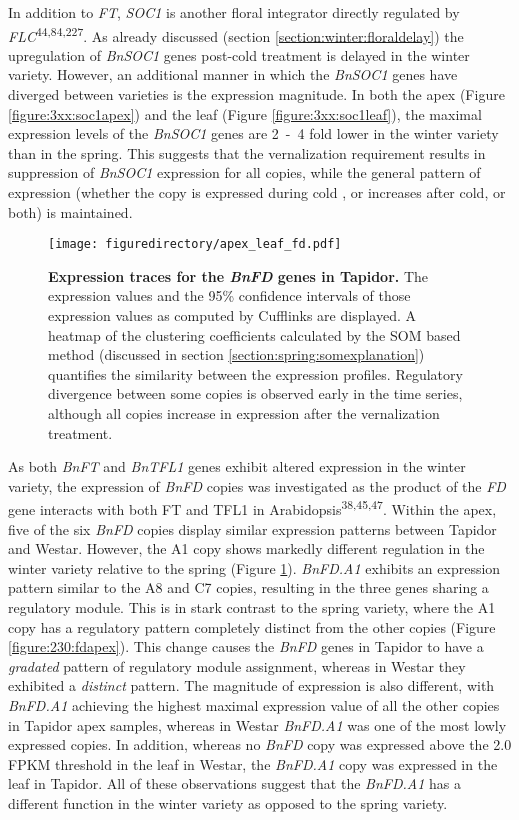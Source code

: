 \documentclass[12pt,]{book}
\begin{document}
In addition to \emph{FT}, \emph{SOC1} is another floral integrator
directly regulated by \emph{FLC}\textsuperscript{44,84,227}. As already
discussed (section \ref{section:winter:floraldelay}) the upregulation of
\emph{BnSOC1} genes post-cold treatment is delayed in the winter
variety. However, an additional manner in which the \emph{BnSOC1} genes
have diverged between varieties is the expression magnitude. In both the
apex (Figure \ref{figure:3xx:soc1apex}) and the leaf (Figure
\ref{figure:3xx:soc1leaf}), the maximal expression levels of the
\emph{BnSOC1} genes are 2~-~4 fold lower in the winter variety than in
the spring. This suggests that the vernalization requirement results in
suppression of \emph{BnSOC1} expression for all copies, while the
general pattern of expression (whether the copy is expressed during cold
, or increases after cold, or both) is maintained.

\begin{figure}[htbp]
\centering
\texttt{[image: figuredirectory/apex\_leaf\_fd.pdf]}
\caption{\textbf{Expression traces for the \emph{BnFD} genes in
Tapidor.} The expression values and the 95\% confidence intervals of
those expression values as computed by Cufflinks are displayed. A
heatmap of the clustering coefficients calculated by the SOM based
method (discussed in section \ref{section:spring:somexplanation})
quantifies the similarity between the expression profiles. Regulatory
divergence between some copies is observed early in the time series,
although all copies increase in expression after the vernalization
treatment.}\label{figure:3xx:fdleafapex}
\end{figure}

As both \emph{BnFT} and \emph{BnTFL1} genes exhibit altered expression
in the winter variety, the expression of \emph{BnFD} copies was
investigated as the product of the \emph{FD} gene interacts with both FT
and TFL1 in Arabidopsis\textsuperscript{38,45,47}. Within the apex, five
of the six \emph{BnFD} copies display similar expression patterns
between Tapidor and Westar. However, the A1 copy shows markedly
different regulation in the winter variety relative to the spring
(Figure \ref{figure:3xx:fdleafapex}). \emph{BnFD.A1} exhibits an
expression pattern similar to the A8 and C7 copies, resulting in the
three genes sharing a regulatory module. This is in stark contrast to
the spring variety, where the A1 copy has a regulatory pattern
completely distinct from the other copies (Figure
\ref{figure:230:fdapex}). This change causes the \emph{BnFD} genes in
Tapidor to have a \emph{gradated} pattern of regulatory module
assignment, whereas in Westar they exhibited a \emph{distinct} pattern.
The magnitude of expression is also different, with \emph{BnFD.A1}
achieving the highest maximal expression value of all the other copies
in Tapidor apex samples, whereas in Westar \emph{BnFD.A1} was one of the
most lowly expressed copies. In addition, whereas no \emph{BnFD} copy
was expressed above the 2.0 FPKM threshold in the leaf in Westar, the
\emph{BnFD.A1} copy was expressed in the leaf in Tapidor. All of these
observations suggest that the \emph{BnFD.A1} has a different function in
the winter variety as opposed to the spring variety.
\end{document}
